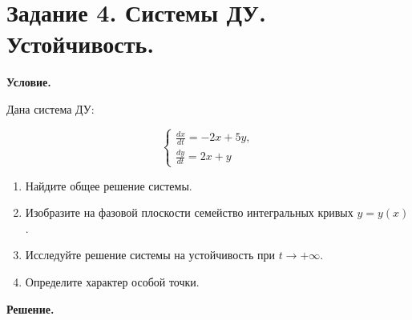\section{Задание 4. Системы ДУ. Устойчивость.}

\textbf{Условие.}

Дана система ДУ:

\[\begin{cases}
      \frac{dx}{dt} = -2x + 5y, \\ \frac{dy}{dt} = 2x + y
\end{cases}\]

\begin{enumerate}
    \item Найдите общее решение системы.
    \item Изобразите на фазовой плоскости семейство интегральных кривых $y = y(x)$.
    \item Исследуйте решение системы на устойчивость при $t \to +\infty$.
    \item Определите характер особой точки.
\end{enumerate}

\vspace{10mm}
\textbf{Решение.}


